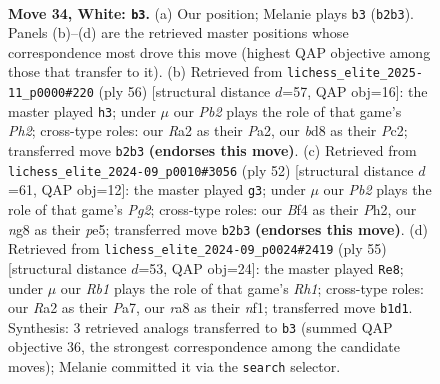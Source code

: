 \documentclass[11pt]{article}
\begin{document}
\clearpage

\begin{figure}[p]\centering
\begin{subfigure}{0.46\textwidth}\centering
\resizebox{\linewidth}{!}{%
\newchessgame
\chessboard[
  setfen={r2b2nr/p4k1p/8/2p5/5B2/P2B3P/RPP3P1/1R4K1 w - - 2 34},
  showmover=false,
  pgfstyle=straightmove, color=movearrow, markmove={b2-b3}
]}
\caption{}
\end{subfigure}\hfill
\begin{subfigure}{0.46\textwidth}\centering
\resizebox{\linewidth}{!}{%
\newchessgame
\chessboard[
  setfen={4r1k1/8/bp5p/p2r1pp1/8/2B5/PPP2RPP/2R3K1 w - - 0 29},
  showmover=false,
  pgfstyle=straightmove, color=movearrow, markmove={h2-h3}
]}
\caption{}
\end{subfigure}
\\[4pt]
\begin{subfigure}{0.46\textwidth}\centering
\resizebox{\linewidth}{!}{%
\newchessgame
\chessboard[
  setfen={1r6/2p3p1/p1knr2p/4p3/2P5/4B3/P3RPPP/2R3K1 w - - 1 27},
  showmover=false,
  pgfstyle=straightmove, color=movearrow, markmove={g2-g3}
]}
\caption{}
\end{subfigure}\hfill
\begin{subfigure}{0.46\textwidth}\centering
\resizebox{\linewidth}{!}{%
\newchessgame
\chessboard[
  setfen={2k4r/p1p4p/3b2p1/8/2pP4/8/PPK2R1P/5N2 b - - 0 28},
  showmover=false,
  pgfstyle=straightmove, color=movearrow, markmove={h8-e8}
]}
\caption{}
\end{subfigure}
\caption{\textbf{Move 34, White: \texttt{b3}.} (a) Our position; Melanie plays \texttt{b3} (\texttt{b2b3}). Panels (b)--(d) are the retrieved master positions whose correspondence most drove this move (highest QAP objective among those that transfer to it). (b) Retrieved from \texttt{lichess\_elite\_2025-11\_p0000\#220} (ply 56) [structural distance $d$=57, QAP obj=16]: the master played \texttt{h3}; under $\mu$ our \emph{Pb2} plays the role of that game's \emph{Ph2}; cross-type roles: our \emph{R}a2 as their \emph{P}a2, our \emph{b}d8 as their \emph{P}c2; transferred move \texttt{b2b3} \textbf{(endorses this move)}. (c) Retrieved from \texttt{lichess\_elite\_2024-09\_p0010\#3056} (ply 52) [structural distance $d$=61, QAP obj=12]: the master played \texttt{g3}; under $\mu$ our \emph{Pb2} plays the role of that game's \emph{Pg2}; cross-type roles: our \emph{B}f4 as their \emph{P}h2, our \emph{n}g8 as their \emph{p}e5; transferred move \texttt{b2b3} \textbf{(endorses this move)}. (d) Retrieved from \texttt{lichess\_elite\_2024-09\_p0024\#2419} (ply 55) [structural distance $d$=53, QAP obj=24]: the master played \texttt{Re8}; under $\mu$ our \emph{Rb1} plays the role of that game's \emph{Rh1}; cross-type roles: our \emph{R}a2 as their \emph{P}a7, our \emph{r}a8 as their \emph{n}f1; transferred move \texttt{b1d1}. Synthesis: 3 retrieved analogs transferred to \texttt{b3} (summed QAP objective 36, the strongest correspondence among the candidate moves); Melanie committed it via the \texttt{search} selector.}
\label{fig:thought-m66}
\end{figure}
\end{document}
